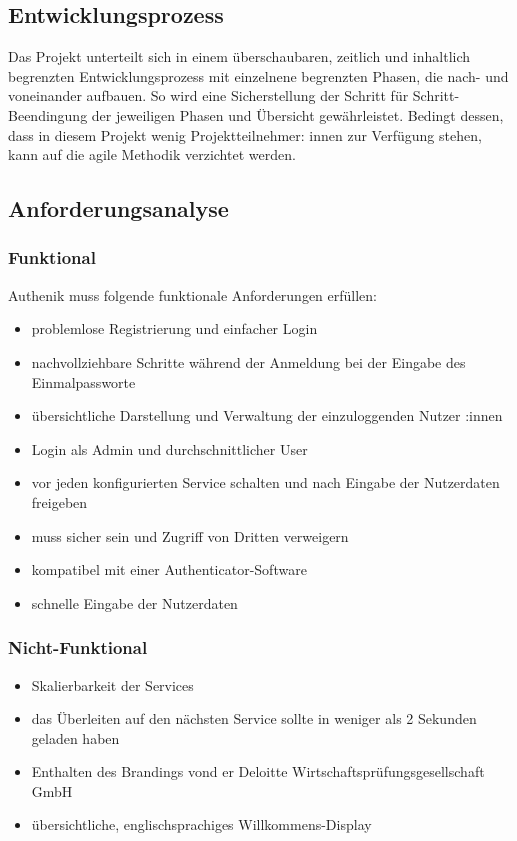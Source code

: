 \subsection{Entwicklungsprozess}
\label{sec:Entwicklungsprozess}
Das Projekt unterteilt sich in einem überschaubaren, zeitlich und inhaltlich begrenzten Entwicklungsprozess 
mit einzelnene begrenzten Phasen, die nach- und voneinander aufbauen. So wird eine Sicherstellung der Schritt 
für Schritt-Beendingung der jeweiligen Phasen und Übersicht gewährleistet. Bedingt dessen, dass in diesem Projekt 
wenig Projektteilnehmer: innen zur Verfügung stehen, kann auf die agile Methodik verzichtet werden.

\subsection{Anforderungsanalyse}
\label{sec:Anforderungsanalyse}

\subsubsection{Funktional}
\label{sec:Funktional}
Authenik muss folgende funktionale Anforderungen erfüllen:
\begin{itemize} [label=--]
	\item problemlose Registrierung und einfacher Login
	\item nachvollziehbare Schritte während der Anmeldung bei der Eingabe des Einmalpassworte
	\item übersichtliche Darstellung und Verwaltung der einzuloggenden Nutzer :innen
	\item Login als Admin und durchschnittlicher User
	\item vor jeden konfigurierten Service schalten und nach Eingabe der Nutzerdaten freigeben
	\item muss sicher sein und Zugriff von Dritten verweigern
	\item kompatibel mit einer Authenticator-Software
	\item schnelle Eingabe der Nutzerdaten
\end{itemize}

\subsubsection{Nicht-Funktional}
\label{sec:Nicht-Funktional}
\begin{itemize} [label=--]
	\item Skalierbarkeit der Services
	\item das Überleiten auf den nächsten Service sollte in weniger als 2 Sekunden geladen haben
	\item Enthalten des Brandings vond er Deloitte Wirtschaftsprüfungsgesellschaft GmbH
	\item übersichtliche, englischsprachiges Willkommens-Display
\end{itemize}
	